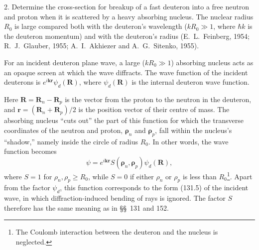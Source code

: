 2. Determine the cross-section for breakup of a fast deuteron into a free neutron and proton when it is scattered by a heavy absorbing nucleus. The nuclear radius $R_0$ is large compared both with the deuteron's wavelength ($kR_0\gg1$, where $\hbar k$ is the deuteron momentum) and with the deuteron's radius (E.~L.~Feinberg, 1954; R.~J.~Glauber, 1955; A.~I.~Akhiezer and A.~G.~Sitenko, 1955).

\SolutionHeading
For an incident deuteron plane wave, a large ($kR_0\gg1$) absorbing nucleus acts as an opaque screen at which the wave diffracts. The wave function of the incident deuterons is $e^{i\mathbf k\mathbf r}\psi_d(\mathbf R)$, where $\psi_d(\mathbf R)$ is the internal deuteron wave function.

Here $\mathbf R=\mathbf R_n-\mathbf R_p$ is the vector from the proton to the neutron in the deuteron, and $\mathbf r=(\mathbf R_n+\mathbf R_p)/2$ is the position vector of their centre of mass. The absorbing nucleus ``cuts out'' the part of this function for which the transverse coordinates of the neutron and proton, $\boldsymbol\rho_n$ and $\boldsymbol\rho_p$, fall within the nucleus's ``shadow,'' namely inside the circle of radius $R_0$. In other words, the wave function becomes
\[
 \psi=e^{i\mathbf k\mathbf r}S(\boldsymbol\rho_n,\boldsymbol\rho_p)\psi_d(\mathbf R),
\]
where $S=1$ for $\rho_n,\rho_p\geqslant R_0$, while $S=0$ if either $\rho_n$ or $\rho_p$ is less than $R_0$\footnote{The Coulomb interaction between the deuteron and the nucleus is neglected.}. Apart from the factor $\psi_d$, this function corresponds to the form (131.5) of the incident wave, in which diffraction-induced bending of rays is ignored. The factor $S$ therefore has the same meaning as in §§~131 and 152.

